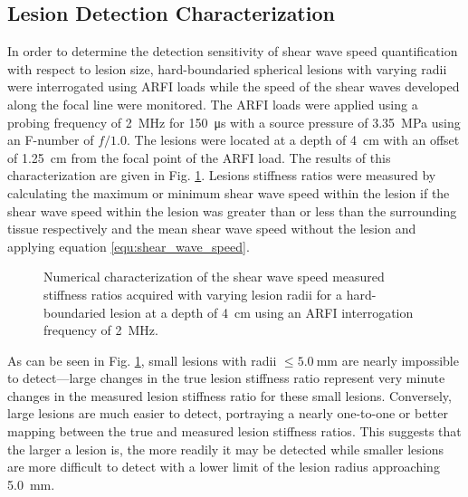 		\FloatBarrier
		\subsection{Lesion Detection Characterization}
			In order to determine the detection sensitivity of shear wave speed quantification with respect to lesion size, hard-boundaried spherical lesions with varying radii were interrogated using ARFI loads while the speed of the shear waves developed along the focal line were monitored. The ARFI loads were applied using a probing frequency of \SI{2}{\MHz} for \SI{150}{\us} with a source pressure of \SI{3.35}{\MPa} using an F-number of $f/1.0$. The lesions were located at a depth of \SI{4}{\cm} with an offset of \SI{1.25}{\cm} from the focal point of the ARFI load. The results of this characterization are given in Fig. \ref{fig:erel_radius}. Lesions stiffness ratios were measured by calculating the maximum or minimum shear wave speed within the lesion if the shear wave speed within the lesion was greater than or less than the surrounding tissue respectively and the mean shear wave speed without the lesion and applying equation \ref{equ:shear_wave_speed}.

			\begin{figure}[!htb]
				\centering
				\caption[Numerical characterization of shear wave speed measured stiffness ratio with changing lesion radius]{Numerical characterization of the shear wave speed measured stiffness ratios acquired with varying lesion radii for a hard-boundaried lesion at a depth of \SI{4}{\cm} using an ARFI interrogation frequency of \SI{2}{\MHz}.}
				\label{fig:erel_radius}
			\end{figure}

			As can be seen in Fig. \ref{fig:erel_radius}, small lesions with radii $\leq \SI{5.0}{\mm}$ are nearly impossible to detect---large changes in the true lesion stiffness ratio represent very minute changes in the measured lesion stiffness ratio for these small lesions. Conversely, large lesions are much easier to detect, portraying a nearly one-to-one or better mapping between the true and measured lesion stiffness ratios. This suggests that the larger a lesion is, the more readily it may be detected while smaller lesions are more difficult to detect with a lower limit of the lesion radius approaching \SI{5.0}{\mm}.

